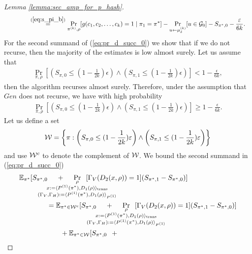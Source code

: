 \begin{proof}[Lemma \ref{lemma:sec_amp_for_p_hash}]
\begin{align}
  &\mbox\qquad\qquad \stackrel{(\ref{eq:s_pi_b})}{=}
   \underset{\pi^{(k)}, \rho}{\Pr}[g(c_1, c_2,\dots, c_k) = 1 \mid \pi_1 = \pi^*] -  \underset{u \leftarrow \mu_{\delta}^{(k)}}{\Pr}[u \in \mathcal{G}_0]  - S_{\pi^*,0} - \frac{\varepsilon}{6k}.
\end{align}
For the second summand of (\ref{eq:pr_d_succ_0}) we show that if we do not recurse, then the majority of the estimates is low almost surely.
Let us assume that
\begin{align}
\underset{\pi, \rho}{\Pr}\left[\left(S_{\pi,0} \leq (1 - \frac{1}{2k})\epsilon\right) \land \left( S_{\pi,1} \leq (1-\frac{1}{2k})\epsilon\right)\right] < 1 - \frac{\epsilon}{6k},
\end{align}
then the algorithm recurses almost surely.
Therefore, under the assumption that $Gen$ does not recurse, we have with high probability
\begin{align}
\underset{\pi, \rho}{\Pr}\left[\left(S_{\pi,0} \leq (1 - \frac{1}{2k})\epsilon\right) \land \left( S_{\pi,1} \leq (1-\frac{1}{2k})\epsilon\right)\right] \geq 1 - \frac{\epsilon}{6k}.
\end{align}
Let us define a set
\begin{align}
  \mathcal{W} = \left\{ \pi :  \left(S_{\pi,0} \leq (1 - \frac{1}{2k})\varepsilon\right) \land \left( S_{\pi,1} \leq (1-\frac{1}{2k})\varepsilon \right) \right\}
\end{align}
and use $\mathcal{W}^c$ to denote the complement of $\mathcal{W}$.
We bound the second summand in (\ref{eq:pr_d_succ_0})
\begin{align}
  \label{ineq:second_eq}
&\mathbb{E}_{\pi^*}[ S_{\pi^*,0}
\mkern23mu
+
\mkern23mu
\underset{
  \mathclap{
  \substack{\rho \\ x := \langle P^{(1)}(\pi^*), D_1(\rho) \rangle_{\text{trans}}
    \\ (\Gamma_V, \Gamma_H) := \langle P^{(1)}(\pi^*), D_1 (\rho) \rangle_{P^{(1)}} }}}
{\Pr}\mkern13mu[\Gamma_V(D_2(x, \rho)) = 1]
(S_{\pi^*,1} - S_{\pi^*,0})] \notag\\
%
&\IndII = \mathbb{E}_{\pi^* \in \cW^c}[ S_{\pi^*,0}
\mkern23mu + \mkern23mu
\underset{
  \mathclap{
  \substack{\rho \\ x := \langle P^{(1)}(\pi^*), D_1(\rho) \rangle_{\text{trans}}
    \\ (\Gamma_V, \Gamma_H) := \langle P^{(1)}(\pi^*), D_1 (\rho) \rangle_{P^{(1)}} }}}
{\Pr}\mkern13mu[\Gamma_V(D_2(x, \rho)) = 1]
  (S_{\pi^*,1} - S_{\pi^*,0})] \notag\\
&\IndIII +  \mathbb{E}_{\pi^* \in \cW}[ S_{\pi^*,0} \mkern13mu + \mkern13mu

\end{align}
\end{proof}
